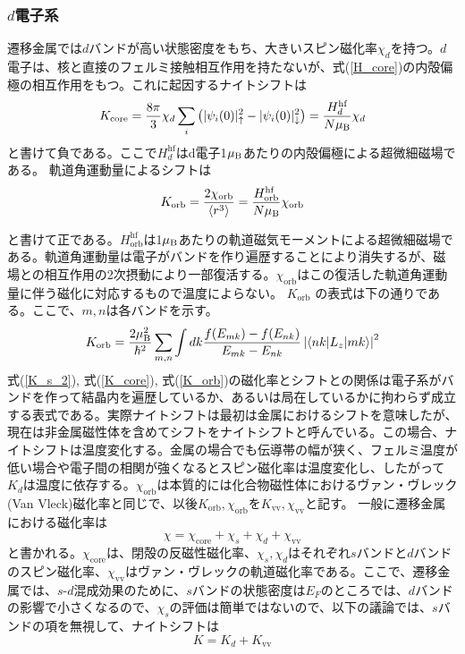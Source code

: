 \documentclass[11pt,a4j]{jreport}
\begin{document}
\subsubsection{$d$電子系}
遷移金属では$d$バンドが高い状態密度をもち、大きいスピン磁化率$\chi_d$を持つ。$d$電子は、核と直接のフェルミ接触相互作用を持たないが、式(\ref{H_core})の内殻偏極の相互作用をもつ。これに起因するナイトシフトは
\begin{equation}
  K_{\text{core}} = \frac{8\pi}{3} \chi_d \sum_i \left( |\psi_i(0)|^2_{\uparrow} - |\psi_i(0)|^2_{\downarrow} \right) = \frac{H_d^{\text{hf}}}{N\mu_{\text B}} \chi_d
  \label{K_core}
\end{equation}
と書けて負である。ここで$H_d^{\text{hf}}$はd電子1$\mu_{\text B}$あたりの内殻偏極による超微細磁場である。
軌道角運動量によるシフトは
\begin{equation}
  K_{\text{orb}} = \frac{2 \chi_{\text{orb}}}{\langle r^3 \rangle} = \frac{H_{\text{orb}}^{\text{hf}}}{N \mu_{\text B}} \chi_{\text{orb}}
  \label{K_orb}
\end{equation}

と書けて正である。$H_{\text{orb}}^{\text{hf}}$は1$\mu_{\text B}$あたりの軌道磁気モーメントによる超微細磁場である。軌道角運動量は電子がバンドを作り遍歴することにより消失するが、磁場との相互作用の2次摂動により一部復活する。$\chi_{\text{orb}}$はこの復活した軌道角運動量に伴う磁化に対応するもので温度によらない。
$K_{\text{orb}}$ の表式は下の通りである。ここで、$m, n$は各バンドを示す。
\begin{equation}
  K_{\text{orb}} = \frac{2 \mu_{\text B}^2}{\hbar^2} \sum_{m,n} \int dk \frac{f(E_{mk}) - f(E_{nk})}{E_{mk} - E_{nk}} \left| \langle nk | L_z | mk \rangle \right|^2
\end{equation}
式(\ref{K_s_2}), 式(\ref{K_core}), 式(\ref{K_orb})の磁化率とシフトとの関係は電子系がバンドを作って結晶内を遍歴しているか、あるいは局在しているかに拘わらず成立する表式である。実際ナイトシフトは最初は金属におけるシフトを意味したが、現在は非金属磁性体を含めてシフトをナイトシフトと呼んでいる。この場合、ナイトシフトは温度変化する。金属の場合でも伝導帯の幅が狭く、フェルミ温度が低い場合や電子間の相関が強くなるとスピン磁化率は温度変化し、したがって$K_d$は温度に依存する。$\chi_{\text{orb}}$は本質的には化合物磁性体におけるヴァン・ヴレック(Van Vleck)磁化率と同じで、以後$K_{\text{orb}}, \chi_{\text{orb}}$を$K_{\text{vv}}, \chi_{\text{vv}}$と記す。
一般に遷移金属における磁化率は
\begin{equation}
  \chi = \chi_{\text{core}} + \chi_s + \chi_d + \chi_{\text{vv}}
\end{equation}
と書かれる。$\chi_{\text{core}}$は、閉殻の反磁性磁化率、$\chi_s, \chi_d$はそれぞれ$s$バンドと$d$バンドのスピン磁化率、$\chi_{\text{vv}}$はヴァン・ヴレックの軌道磁化率である。ここで、遷移金属では、$s$-$d$混成効果のために、$s$バンドの状態密度は$E_F$のところでは、$d$バンドの影響で小さくなるので、$\chi_s$の評価は簡単ではないので、以下の議論では、$s$バンドの項を無視して、ナイトシフトは
\begin{equation}
  K = K_d + K_{\text{vv}}
\end{equation}
\end{document}
